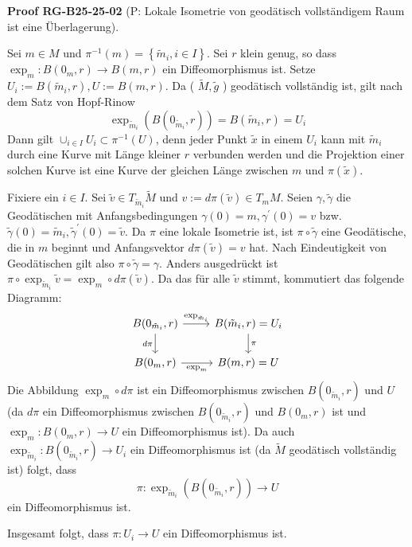 \documentclass[10pt, letterpaper]{article}
\newcommand{\CustomHeading}[3]{%
  \par\medskip\noindent%
  \textbf{#1 #2} \textnormal{(#3)}.\enskip%
}
\newenvironment{PROOF}[2]{\begin{unitbox}\CustomHeading{Proof}{#1}{#2}}{\end{unitbox}}
\begin{document}
\begin{PROOF}{RG-B25-25-02}{P: Lokale Isometrie von geodätisch vollständigem Raum ist eine Überlagerung}
Sei $m \in M$ und $\pi^{-1}(m)=\left\{\tilde{m}_{i}, i \in I\right\}$. Sei $r$ klein genug, so dass $\exp _{m}: B\left(0_{m}, r\right) \rightarrow B(m, r)$ ein Diffeomorphismus ist. Setze $U_{i}:=B\left(\tilde{m}_{i}, r\right), U:=B(m, r)$. Da ( $\tilde{M}, \tilde{g}$ ) geodätisch vollständig ist, gilt nach dem Satz von Hopf-Rinow
$$
\exp _{\tilde{m}_{i}}\left(B\left(0_{\tilde{m}_{i}}, r\right)\right)=B\left(\tilde{m}_{i}, r\right)=U_{i}
$$
Dann gilt $\cup_{i \in I} U_{i} \subset \pi^{-1}(U)$, denn jeder Punkt $\tilde{x}$ in einem $U_{i}$ kann mit $\tilde{m}_{i}$ durch eine Kurve mit Länge kleiner $r$ verbunden werden und die Projektion einer solchen Kurve ist eine Kurve der gleichen Länge zwischen $m$ und $\pi(\tilde{x})$.

Fixiere ein $i \in I$. Sei $\tilde{v} \in T_{\tilde{m}_{i}} \tilde{M}$ und $v:=d \pi(\tilde{v}) \in T_{m} M$. Seien $\gamma, \tilde{\gamma}$ die Geodätischen mit Anfangsbedingungen $\gamma(0)=m, \gamma^{\prime}(0)=v$ bzw. $\tilde{\gamma}(0)=\tilde{m}_{i}, \tilde{\gamma}^{\prime}(0)=\tilde{v}$. Da $\pi$ eine lokale Isometrie ist, ist $\pi \circ \tilde{\gamma}$ eine Geodätische, die in $m$ beginnt und Anfangsvektor $d \pi(\tilde{v})=v$ hat. Nach Eindeutigkeit von Geodätischen gilt also $\pi \circ \tilde{\gamma}=\gamma$. Anders ausgedrückt ist $\pi \circ \exp _{\tilde{m}_{i}} \tilde{v}=\exp _{m} \circ d \pi(\tilde{v})$. Da das für alle $\tilde{v}$ stimmt, kommutiert das folgende Diagramm:
\[
\begin{tikzcd}
B(0_{\tilde{m}_i}, r) \arrow[r, "\exp_{\tilde{m}_i}"] \arrow[d, "d\pi"'] 
  & B(\tilde{m}_i, r) = U_i \arrow[d, "\pi"] \\
B(0_m, r) \arrow[r, "\exp_m"'] 
  & B(m, r) = U
\end{tikzcd}
\]
Die Abbildung $\exp _{m} \circ d \pi$ ist ein Diffeomorphismus zwischen $B\left(0_{\tilde{m}_{i}}, r\right)$ und $U$ (da $d \pi$ ein Diffeomorphismus zwischen $B\left(0_{\tilde{m}_{i}}, r\right)$ und $B\left(0_{m}, r\right)$ ist und $\exp _{m}: B\left(0_{m}, r\right) \rightarrow U$ ein Diffeomorphismus ist). Da auch $\exp _{\tilde{m}_{i}}: B\left(0_{\tilde{m}_{i}}, r\right) \rightarrow U_{i}$ ein Diffeomorphismus ist (da $\tilde{M}$ geodätisch vollständig ist) folgt, dass
$$
\pi: \exp _{\tilde{m}_{i}}\left(B\left(0_{\tilde{m}_{i}}, r\right)\right) \rightarrow U
$$
ein Diffeomorphismus ist.

Insgesamt folgt, dass $\pi: U_{i} \rightarrow U$ ein Diffeomorphismus ist.



\end{PROOF}
\end{document}
